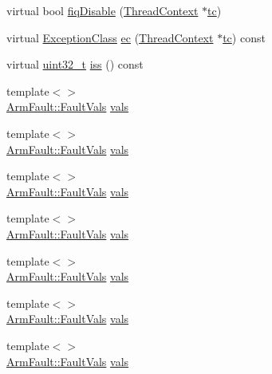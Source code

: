 \begin{DoxyCompactItemize}
\item 
virtual bool \hyperlink{classArmISA_1_1ArmFaultVals_a554b3d306d50e92e5d8102124be41fe7}{fiqDisable} (\hyperlink{classThreadContext}{ThreadContext} $\ast$\hyperlink{namespaceArmISA_a5aff829af55e65b802d83dfcef4e9dd0}{tc})
\item 
virtual \hyperlink{namespaceArmISA_a04034d12009cf36227f4d2abff3331a2}{ExceptionClass} \hyperlink{classArmISA_1_1ArmFaultVals_aa4dd5fb47a1253dbe17e692e905a8c7c}{ec} (\hyperlink{classThreadContext}{ThreadContext} $\ast$\hyperlink{namespaceArmISA_a5aff829af55e65b802d83dfcef4e9dd0}{tc}) const 
\item 
virtual \hyperlink{Type_8hh_a435d1572bf3f880d55459d9805097f62}{uint32\_\-t} \hyperlink{classArmISA_1_1ArmFaultVals_a1049bf31f8df10c66994603055cf531d}{iss} () const 
\item 
{\footnotesize template$<$$>$ }\\\hyperlink{structArmISA_1_1ArmFault_1_1FaultVals}{ArmFault::FaultVals} \hyperlink{classArmISA_1_1ArmFaultVals_a7b40df863f325ba499b5fa5a34ad8f9d}{vals}
\item 
{\footnotesize template$<$$>$ }\\\hyperlink{structArmISA_1_1ArmFault_1_1FaultVals}{ArmFault::FaultVals} \hyperlink{classArmISA_1_1ArmFaultVals_a7b40df863f325ba499b5fa5a34ad8f9d}{vals}
\item 
{\footnotesize template$<$$>$ }\\\hyperlink{structArmISA_1_1ArmFault_1_1FaultVals}{ArmFault::FaultVals} \hyperlink{classArmISA_1_1ArmFaultVals_a7b40df863f325ba499b5fa5a34ad8f9d}{vals}
\item 
{\footnotesize template$<$$>$ }\\\hyperlink{structArmISA_1_1ArmFault_1_1FaultVals}{ArmFault::FaultVals} \hyperlink{classArmISA_1_1ArmFaultVals_a7b40df863f325ba499b5fa5a34ad8f9d}{vals}
\item 
{\footnotesize template$<$$>$ }\\\hyperlink{structArmISA_1_1ArmFault_1_1FaultVals}{ArmFault::FaultVals} \hyperlink{classArmISA_1_1ArmFaultVals_a7b40df863f325ba499b5fa5a34ad8f9d}{vals}
\item 
{\footnotesize template$<$$>$ }\\\hyperlink{structArmISA_1_1ArmFault_1_1FaultVals}{ArmFault::FaultVals} \hyperlink{classArmISA_1_1ArmFaultVals_a7b40df863f325ba499b5fa5a34ad8f9d}{vals}
\item 
{\footnotesize template$<$$>$ }\\\hyperlink{structArmISA_1_1ArmFault_1_1FaultVals}{ArmFault::FaultVals} \hyperlink{classArmISA_1_1ArmFaultVals_a7b40df863f325ba499b5fa5a34ad8f9d}{vals}

\end{DoxyCompactItemize}
